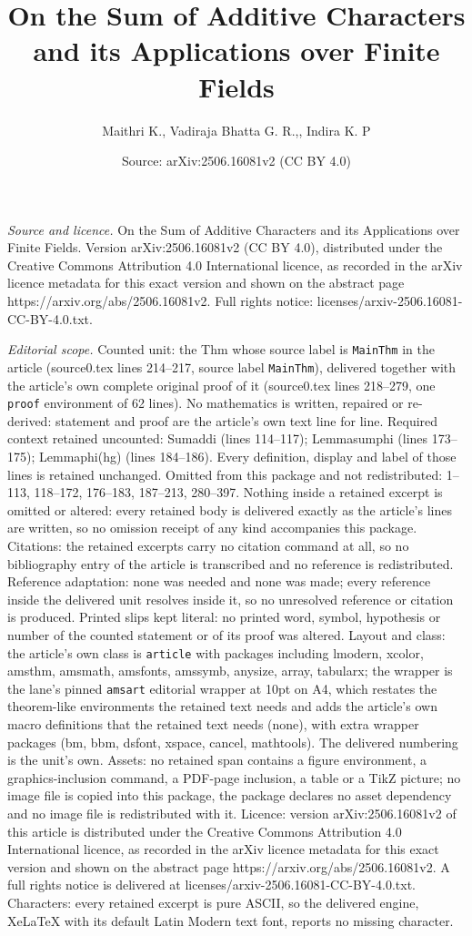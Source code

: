 \documentclass[10pt,a4paper]{amsart}
\title[On the Sum of Additive Characters and its Applications over ]{On the Sum of Additive Characters and its Applications over Finite Fields}
\author{Maithri K., Vadiraja Bhatta G. R.,, Indira K. P}
\date{Source: arXiv:2506.16081v2 (CC BY 4.0)}
\begin{document}
\maketitle

\noindent\emph{Source and licence.} On the Sum of Additive Characters and its Applications over Finite Fields. Version arXiv:2506.16081v2 (CC BY 4.0), distributed under the Creative Commons Attribution 4.0 International licence, as recorded in the arXiv licence metadata for this exact version and shown on the abstract page https://arxiv.org/abs/2506.16081v2. Full rights notice: licenses/arxiv-2506.16081-CC-BY-4.0.txt.\par\smallskip

\noindent\textit{Editorial scope.} Counted unit: the Thm whose source label is \texttt{MainThm} in the article (source0.tex lines 214--217, source label \texttt{MainThm}), delivered together with the article's own complete original proof of it (source0.tex lines 218--279, one \texttt{proof} environment of 62 lines). No mathematics is written, repaired or re-derived: statement and proof are the article's own text line for line. Required context retained uncounted: Sumaddi (lines 114--117); Lemmasumphi (lines 173--175); Lemmaphi(hg) (lines 184--186). Every definition, display and label of those lines is retained unchanged. Omitted from this package and not redistributed: 1--113, 118--172, 176--183, 187--213, 280--397. Nothing inside a retained excerpt is omitted or altered: every retained body is delivered exactly as the article's lines are written, so no omission receipt of any kind accompanies this package. Citations: the retained excerpts carry no citation command at all, so no bibliography entry of the article is transcribed and no reference is redistributed. Reference adaptation: none was needed and none was made; every reference inside the delivered unit resolves inside it, so no unresolved reference or citation is produced. Printed slips kept literal: no printed word, symbol, hypothesis or number of the counted statement or of its proof was altered. Layout and class: the article's own class is \texttt{article} with packages including lmodern, xcolor, amsthm, amsmath, amsfonts, amssymb, anysize, array, tabularx; the wrapper is the lane's pinned \texttt{amsart} editorial wrapper at 10pt on A4, which restates the theorem-like environments the retained text needs and adds the article's own macro definitions that the retained text needs (none), with extra wrapper packages (bm, bbm, dsfont, xspace, cancel, mathtools). The delivered numbering is the unit's own. Assets: no retained span contains a figure environment, a graphics-inclusion command, a PDF-page inclusion, a table or a TikZ picture; no image file is copied into this package, the package declares no asset dependency and no image file is redistributed with it. Licence: version arXiv:2506.16081v2 of this article is distributed under the Creative Commons Attribution 4.0 International licence, as recorded in the arXiv licence metadata for this exact version and shown on the abstract page https://arxiv.org/abs/2506.16081v2. A full rights notice is delivered at licenses/arxiv-2506.16081-CC-BY-4.0.txt. Characters: every retained excerpt is pure ASCII, so the delivered engine, XeLaTeX with its default Latin Modern text font, reports no missing character.
\end{document}

